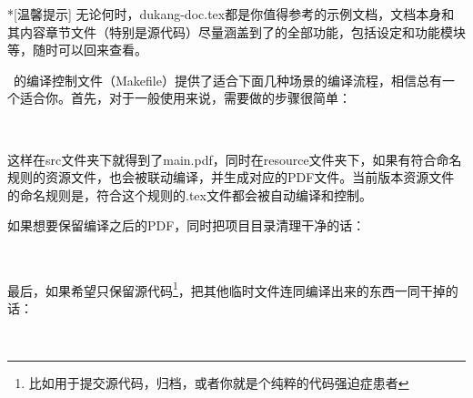 \begin{dkcomment}*[温馨提示]
  \hspace{2em}无论何时，dukang-doc.tex都是你值得参考的示例文档，文档本身和其内容章节文件（特别是源代码）尽量涵盖到了{\dk}的全部功能，包括设定和功能模块等，随时可以回来查看。\faKissWinkHeart
\end{dkcomment}

\dk~的编译控制文件（Makefile）提供了适合下面几种场景的编译流程，相信总有一个适合你。首先，对于一般使用来说，需要做的步骤很简单：

\begin{center}
  ~\faArrowCircleRight~~\faArrowCircleRight~~\faCheckCircle
\end{center}

这样在src文件夹下就得到了main.pdf，同时在resource文件夹下，如果有符合命名规则的资源文件，也会被联动编译，并生成对应的PDF文件。{\dk}当前版本资源文件的命名规则是，符合这个规则的.tex文件都会被自动编译和控制。

如果想要保留编译之后的PDF，同时把项目目录清理干净的话：

\begin{center}
  ~\faArrowCircleRight~~\faArrowCircleRight~~\faArrowCircleRight~~\faCheckCircle
\end{center}

最后，如果希望只保留源代码\footnote{比如用于提交源代码，归档，或者你就是个纯粹的代码强迫症患者{\color{awesome}\faHeart}}，把其他临时文件连同编译出来的东西一同干掉的话：

\begin{center}
  ~\faArrowCircleRight~~\faArrowCircleRight~~\faArrowCircleRight~~\faCheckCircle
\end{center}


\clearpage
